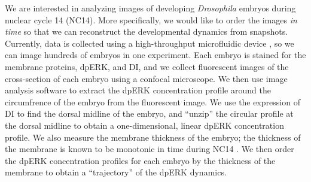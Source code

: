 \documentclass[10pt]{article}
\begin{document}
We are interested in analyzing images of developing {\em Drosophila} embryos during nuclear cycle 14 (NC14).
%
More specifically, we would like to order the images {\em in time} so that we can reconstruct the developmental dynamics from snapshots. 
%
%
Currently, data is collected using a high-throughput microfluidic device \cite{chung2010microfluidic}, so we can image hundreds of embryos in one experiment.
%
Each embryo is stained for the membrane proteins, dpERK, and DI, and we collect fluorescent images of the cross-section of each embryo using a confocal microscope.
%
We then use image analysis software to extract the dpERK concentration profile around the circumfrence of the embryo from the fluorescent image.
%
We use the expression of DI to find the dorsal midline of the embryo, and ``unzip'' the circular profile at the dorsal midline to obtain a one-dimensional, linear dpERK concentration profile.
%
We also measure the membrane thickness of the embryo; the thickness of the membrane is known to be monotonic in time during NC14 \cite{lim2013kinetics, lecuit2002slam}. 
%
We then order the dpERK concentration profiles for each embryo by the thickness of the membrane to obtain a ``trajectory'' of the dpERK dynamics.
\end{document}
